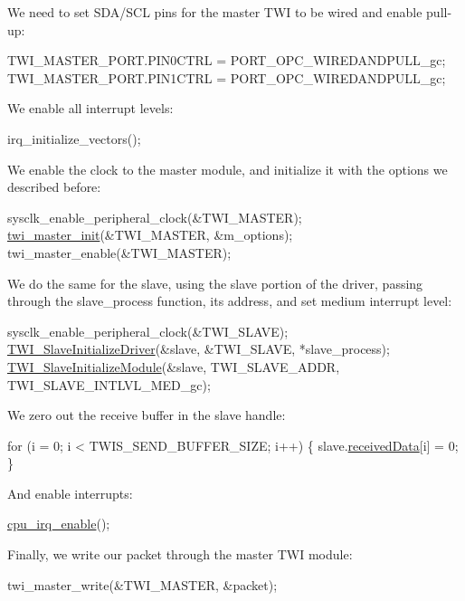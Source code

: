 We need to set S\-D\-A/\-S\-C\-L pins for the master T\-W\-I to be wired and enable pull-\/up\-: 
\begin{DoxyCode}
        TWI\_MASTER\_PORT.PIN0CTRL = PORT\_OPC\_WIREDANDPULL\_gc;
        TWI\_MASTER\_PORT.PIN1CTRL = PORT\_OPC\_WIREDANDPULL\_gc;
\end{DoxyCode}


We enable all interrupt levels\-: 
\begin{DoxyCode}
        irq\_initialize\_vectors();
\end{DoxyCode}


We enable the clock to the master module, and initialize it with the options we described before\-: 
\begin{DoxyCode}
        sysclk\_enable\_peripheral\_clock(&TWI\_MASTER);
        \hyperlink{group__group__xmega__drivers__twi__twim_ga8029a07f3322bf43c289f5acb442ef29}{twi\_master\_init}(&TWI\_MASTER, &m\_options);
        twi\_master\_enable(&TWI\_MASTER);
\end{DoxyCode}


We do the same for the slave, using the slave portion of the driver, passing through the slave\-\_\-process function, its address, and set medium interrupt level\-: 
\begin{DoxyCode}
        sysclk\_enable\_peripheral\_clock(&TWI\_SLAVE);
        \hyperlink{group__group__xmega__drivers__twi__twis_ga14b9327d32373a2481e23bec041cbd7e}{TWI\_SlaveInitializeDriver}(&slave, &TWI\_SLAVE, 
      *slave\_process);
        \hyperlink{group__group__xmega__drivers__twi__twis_ga7516e604cb0aacddd8d1016a54039752}{TWI\_SlaveInitializeModule}(&slave, 
      TWI\_SLAVE\_ADDR,
                TWI\_SLAVE\_INTLVL\_MED\_gc);
\end{DoxyCode}


We zero out the receive buffer in the slave handle\-: 
\begin{DoxyCode}
        \textcolor{keywordflow}{for} (i = 0; i < TWIS\_SEND\_BUFFER\_SIZE; i++) \{
            slave.\hyperlink{struct_t_w_i___slave_a8c205728fdea8bcaeaa0f6f889d83d4d}{receivedData}[i] = 0;
        \}
\end{DoxyCode}


And enable interrupts\-: 
\begin{DoxyCode}
        \hyperlink{group__interrupt__group_gae4922a4bd8ba4150211fbc7f2302403c}{cpu\_irq\_enable}();
\end{DoxyCode}


Finally, we write our packet through the master T\-W\-I module\-: 
\begin{DoxyCode}
        twi\_master\_write(&TWI\_MASTER, &packet);
\end{DoxyCode}


